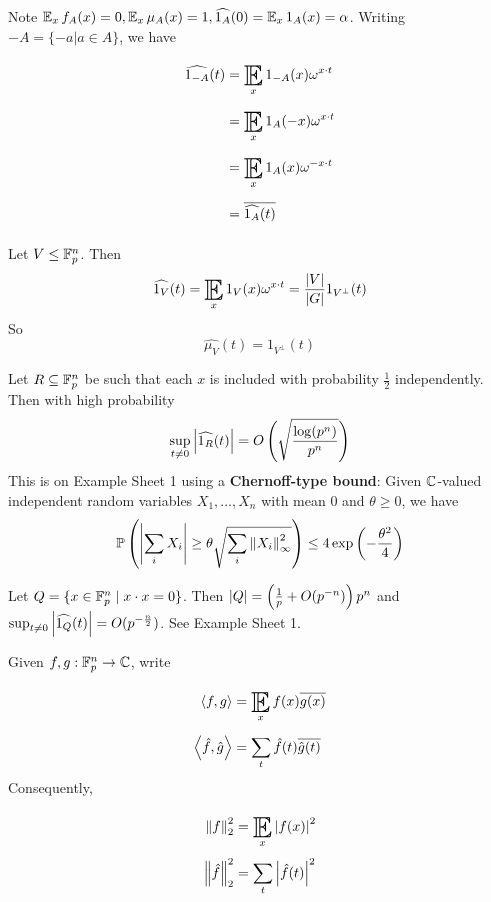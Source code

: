 \documentclass{article}
\begin{document}
Note $\E_x f_A(x) = 0, \E_x \mu_A(x) = 1, \widehat{1_A}(0) = \E_x 1_A(x) = \alpha$. Writing $-A = \{-a | a \in A\}$, we have
\begin{align*}
  \widehat{1_{-A}}(t)
  & = \E_x 1_{-A}(x) \omega^{x \cdot t} \\
  & = \E_x 1_A(-x) \omega^{x \cdot t} \\
  & = \E_x 1_A(x) \omega^{-x \cdot t} \\
  & = \overline{\widehat{1_A}(t)}
\end{align*}

\begin{nex}\label{ex:dft-subspace}
  Let $V \le \mathbb F_p^n$. Then
  $$\widehat{1_V}(t) = \E_x 1_V(x) \omega^{x \cdot t} = \frac{\abs V}{\abs G} 1_{V^\perp}(t)$$
  So
  $$\widehat{\mu_V}(t) = 1_{V^\perp}(t)$$
\end{nex}

\begin{nex}\label{ex:dft-random-set}
  Let $R \subseteq \mathbb F_p^n$ be such that each $x$ is included with probability $\frac 12$ independently. Then with high probability
  $$\sup_{t \ne 0} \left\lvert \widehat{1_R}(t)\right\rvert = O\left(\sqrt{\frac{\log(p^n)}{p^n}}\right)$$
  This is on Example Sheet 1 using a {\bf Chernoff-type bound}: Given $\mathbb C$-valued independent random variables $X_1, \dots, X_n$ with mean $0$ and $\theta \ge 0$, we have
  $$\mathbb P\left(\left\lvert \sum_i X_i\right\rvert \ge \theta\sqrt{\sum_i \left\lVert X_i\right\rVert^2_\infty}\right) \le 4\exp\left(-\frac{\theta^2}4\right)$$
\end{nex}

\begin{nex}
  Let $Q = \{x \in \mathbb F_p^n \mid x \cdot x = 0\}$. Then $\left\lvert Q\right\rvert = \left(\frac 1p + O(p^{-n})\right)p^n$ and $\sup_{t \ne 0} \left\lvert \widehat{1_Q}(t)\right\rvert = O(p^{-\frac n2})$. See Example Sheet 1.
\end{nex}

\begin{notation}
  Given $f, g : \mathbb F_p^n \to \mathbb C$, write
  \begin{align*}
    \inn f g & = \E_x f(x) \overline{g(x)} \\
    \inn{\hat f}{\hat g} & = \sum_t \hat f(t) \overline{\hat g(t)}
  \end{align*}
  Consequently,
  \begin{align*}
    \norm f_2^2 & = \E_x \abs{f(x)}^2 \\
    \norm{\hat f}_2^2 & = \sum_t \abs{\hat f(t)}^2
  \end{align*}
\end{notation}
\end{document}
